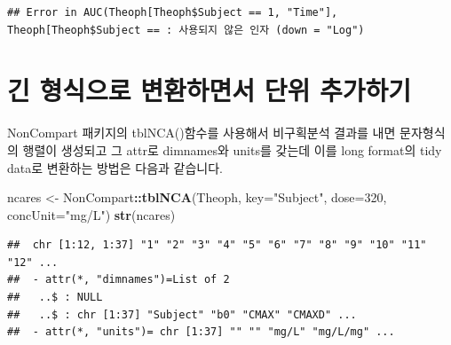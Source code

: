 \documentclass[12pt,]{krantz}
\newenvironment{Shaded}{\begin{snugshade}}{\end{snugshade}}
\newcommand{\KeywordTok}[1]{\textcolor[rgb]{0.13,0.29,0.53}{\textbf{#1}}}
\newcommand{\DataTypeTok}[1]{\textcolor[rgb]{0.13,0.29,0.53}{#1}}
\newcommand{\DecValTok}[1]{\textcolor[rgb]{0.00,0.00,0.81}{#1}}
\newcommand{\StringTok}[1]{\textcolor[rgb]{0.31,0.60,0.02}{#1}}
\newcommand{\OperatorTok}[1]{\textcolor[rgb]{0.81,0.36,0.00}{\textbf{#1}}}
\newcommand{\NormalTok}[1]{#1}
\theoremstyle{definition}
\theoremstyle{definition}
\theoremstyle{definition}
\theoremstyle{remark}
\begin{document}
\begin{verbatim}
## Error in AUC(Theoph[Theoph$Subject == 1, "Time"], Theoph[Theoph$Subject == : 사용되지 않은 인자 (down = "Log")
\end{verbatim}

\section{긴 형식으로 변환하면서 단위 추가하기}\label{long-format}

NonCompart 패키지의 tblNCA()함수를 사용해서 비구획분석 결과를 내면
문자형식의 행렬이 생성되고 그 attr로 dimnames와 units를 갖는데 이를 long
format의 tidy data로 변환하는 방법은 다음과 같습니다.

\begin{Shaded}
\begin{Highlighting}[]
\NormalTok{ncares <-}\StringTok{ }\NormalTok{NonCompart}\OperatorTok{::}\KeywordTok{tblNCA}\NormalTok{(Theoph, }\DataTypeTok{key=}\StringTok{"Subject"}\NormalTok{, }\DataTypeTok{dose=}\DecValTok{320}\NormalTok{, }\DataTypeTok{concUnit=}\StringTok{"mg/L"}\NormalTok{)}
\KeywordTok{str}\NormalTok{(ncares)}
\end{Highlighting}
\end{Shaded}

\begin{verbatim}
##  chr [1:12, 1:37] "1" "2" "3" "4" "5" "6" "7" "8" "9" "10" "11" "12" ...
##  - attr(*, "dimnames")=List of 2
##   ..$ : NULL
##   ..$ : chr [1:37] "Subject" "b0" "CMAX" "CMAXD" ...
##  - attr(*, "units")= chr [1:37] "" "" "mg/L" "mg/L/mg" ...
\end{verbatim}

\begin{Shaded}
\end{Shaded}
\end{document}
